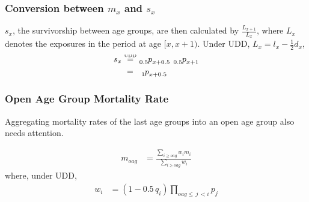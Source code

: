 \documentclass[hyperref={colorlinks, citecolor=blue}]{beamer}
\begin{document}
\begin{frame}
\frametitle{Conversion between $m_x$ and $s_x$}
$s_x$, the survivorship between age groups, are then calculated by $\frac{L_{x+1}}{L_{x}}$, where $L_x$ denotes the exposures in the period at age $[x, x+1)$. Under UDD, $L_x = l_x - \frac{1}{2} d_x$,
\begin{align*}
s_x &\stackrel{\smash{\scriptscriptstyle\mathrm{UDD}}}{=} \tensor[_{0.5}]{p}{_{x+0.5}} \, \, \tensor[_{0.5}]{p}{_{x+1}} \\
	& \, \, = \tensor[_{\phantom{0.}1}]{p}{_{x+0.5}}
\end{align*}
\end{frame}

\begin{frame}
\frametitle{Open Age Group Mortality Rate}
Aggregating mortality rates of the last age groups into an open age group also needs attention.

\begin{align*}
m_{oag} &= \frac{\sum_{i \geq oag} w_i m_i }{\sum_{i \geq oag} w_i}
\end{align*}
where, under UDD,
\begin{align*}
w_i &= (1-0.5 \, q_i) \prod_{oag \leq \, j \, < i} p_j
\end{align*}
\end{frame}
\end{document}
